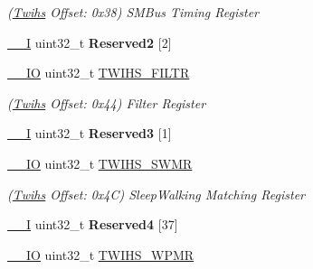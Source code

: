 \begin{DoxyCompactItemize}
\begin{DoxyCompactList}\small\item\em (\mbox{\hyperlink{structTwihs}{Twihs}} Offset\+: 0x38) S\+M\+Bus Timing Register \end{DoxyCompactList}\item 
\mbox{\label{structTwihs_a9aeac0893a2a339d2a2ca5dad17d2c54}} 
\mbox{\hyperlink{core__cm7_8h_af63697ed9952cc71e1225efe205f6cd3}{\+\_\+\+\_\+I}} uint32\+\_\+t {\bfseries Reserved2} \mbox{[}2\mbox{]}
\item 
\mbox{\label{structTwihs_a99eab84e859a8e0f3eabff2658d3f95f}} 
\mbox{\hyperlink{core__cm7_8h_aec43007d9998a0a0e01faede4133d6be}{\+\_\+\+\_\+\+IO}} uint32\+\_\+t \mbox{\hyperlink{structTwihs_a99eab84e859a8e0f3eabff2658d3f95f}{T\+W\+I\+H\+S\+\_\+\+F\+I\+L\+TR}}
\begin{DoxyCompactList}\small\item\em (\mbox{\hyperlink{structTwihs}{Twihs}} Offset\+: 0x44) Filter Register \end{DoxyCompactList}\item 
\mbox{\label{structTwihs_a0348a008d6a7ffd50a2b27ccdbebb0e9}} 
\mbox{\hyperlink{core__cm7_8h_af63697ed9952cc71e1225efe205f6cd3}{\+\_\+\+\_\+I}} uint32\+\_\+t {\bfseries Reserved3} \mbox{[}1\mbox{]}
\item 
\mbox{\label{structTwihs_a1f0b68948d1c41cf3296d10c174cd684}} 
\mbox{\hyperlink{core__cm7_8h_aec43007d9998a0a0e01faede4133d6be}{\+\_\+\+\_\+\+IO}} uint32\+\_\+t \mbox{\hyperlink{structTwihs_a1f0b68948d1c41cf3296d10c174cd684}{T\+W\+I\+H\+S\+\_\+\+S\+W\+MR}}
\begin{DoxyCompactList}\small\item\em (\mbox{\hyperlink{structTwihs}{Twihs}} Offset\+: 0x4C) Sleep\+Walking Matching Register \end{DoxyCompactList}\item 
\mbox{\label{structTwihs_a20c1c06c432073a398d2a04dce79c444}} 
\mbox{\hyperlink{core__cm7_8h_af63697ed9952cc71e1225efe205f6cd3}{\+\_\+\+\_\+I}} uint32\+\_\+t {\bfseries Reserved4} \mbox{[}37\mbox{]}
\item 
\mbox{\label{structTwihs_a67d57414fda24d9a6c55bca2853acada}} 
\mbox{\hyperlink{core__cm7_8h_aec43007d9998a0a0e01faede4133d6be}{\+\_\+\+\_\+\+IO}} uint32\+\_\+t \mbox{\hyperlink{structTwihs_a67d57414fda24d9a6c55bca2853acada}{T\+W\+I\+H\+S\+\_\+\+W\+P\+MR}}

\end{DoxyCompactItemize}

